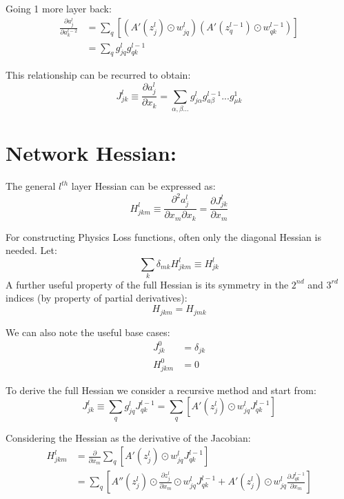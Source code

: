 \documentclass{article}
\begin{document}
Going 1 more layer back:
\begin{align}
\frac{\partial a_j^l}{\partial a_k^{l-2}} &= \sum_q \left[ ( A'(z_j^l) \odot w_{jq}^l ) ( A'(z_q^{l-1}) \odot w_{qk}^{l-1} ) \right] \\
&= \sum_q g_{jq}^l g_{qk}^{l-1}
\end{align}

This relationship can be recurred to obtain:
\begin{equation}
J_{jk}^{l} \equiv \frac{\partial a_j^l}{\partial x_k} = \sum_{\alpha, \beta ... } g_{j\alpha}^l g_{a\beta}^{l-1} ... g_{\mu k}^{1}
\end{equation}

\section*{Network Hessian:}
The general \(l^{th}\) layer Hessian can be expressed as:
\begin{equation}
H_{jkm}^l \equiv \frac{\partial^2 a_j^l}{\partial x_m \partial x_k} = \frac{\partial J_{jk}^l}{\partial x_m}
\end{equation}

For constructing Physics Loss functions, often only the diagonal Hessian is needed. Let:
\begin{equation}
\sum_k \delta_{mk}H_{jkm}^l \equiv H_{jk}^l
\end{equation}
A further useful property of the full Hessian is its symmetry in the \(2^{nd}\) and \(3^{rd}\) indices (by property of partial derivatives):
\begin{equation}
H_{jkm} = H_{jmk}
\end{equation}

We can also note the useful base cases:
\begin{align}
J_{jk}^0 &= \delta_{jk} \\
H_{jkm}^0 &= 0
\end{align}

To derive the full Hessian we consider a recursive method and start from:
\begin{equation}
J_{jk}^l \equiv \sum_q g_{jq}^l J_{qk}^{l-1} = \sum_q \left[ A'(z_j^l) \odot w_{jq}^l J_{qk}^{l-1} \right]
\end{equation}

Considering the Hessian as the derivative of the Jacobian:
\begin{align}
H_{jkm}^l &= \frac{\partial}{\partial x_m} \sum_q \left[ A'(z_j^l) \odot w_{jq}^l J_{qk}^{l-1} \right] \\
&= \sum_q \left[ A''(z_j^l) \odot \frac{\partial z_j^l}{\partial x_m} \odot w_{jq}^l J_{qk}^{l-1} + A'(z_j^l) \odot w_{jq}^l \frac{\partial J_{qk}^{l-1}}{\partial x_m} \right]
\end{align}
\end{document}

